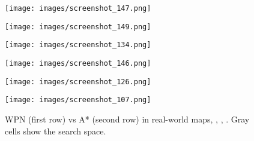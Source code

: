 \documentclass[journal, twocolumn]{IEEEtran}
\begin{document}
\begin{figure}
\begin{minipage}[h]{0.01\columnwidth}
  \centering
    \caption*{}
  \end{minipage}
  \hfill
  \begin{minipage}[b]{0.3\columnwidth}
  \centering
    \vspace{-2 mm}
    \texttt{[image: images/screenshot\_147.png]}
  \end{minipage}
  \hfill
  \begin{minipage}[b]{0.3\columnwidth}
  \centering
    \texttt{[image: images/screenshot\_149.png]}
  \end{minipage}
  \hfill
  \begin{minipage}[b]{0.3\columnwidth}
  \centering
    \texttt{[image: images/screenshot\_134.png]}
  \end{minipage}
\vspace{-8 mm}
\newline
\begin{minipage}[b]{0.01\columnwidth}
  \centering
    \caption*{}
  \end{minipage}
  \hfill
  \begin{minipage}[b]{0.3\columnwidth}
  \centering
    \vspace{-2 mm}
    \hspace{-2 mm}
    \texttt{[image: images/screenshot\_146.png]}
  \end{minipage}
  \hfill
  \begin{minipage}[b]{0.3\columnwidth}
  \centering
      \hspace{-3 mm}
    \texttt{[image: images/screenshot\_126.png]}
  \end{minipage}
  \hfill
  \begin{minipage}[b]{0.3\columnwidth}
  \centering
        \hspace{-3 mm}
    \texttt{[image: images/screenshot\_107.png]}
  \end{minipage}
\caption{WPN (first row) vs A* (second row) in real-world maps, \cite{first_map}, \cite{second_map}, \cite{third_map}. Gray cells show the search space.}
  \label{fig:realmaps}  
  \vspace{-2 mm}
  \end{figure}
  
\end{document}
